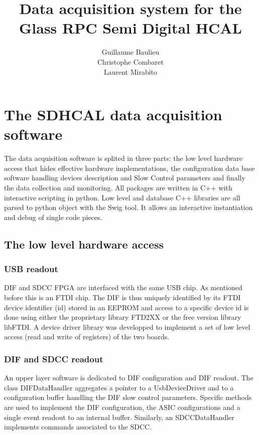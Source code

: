 \documentclass[english]{article}
\title{\textbf{Data acquisition system for the Glass RPC Semi Digital HCAL}}
\author{Guillaume Baulieu\\
		Christophe Combaret\\
		Laurent Mirabito \\
		}
\date{}
\begin{document}
\maketitle
\section{The SDHCAL data acquisition software}
The data acquisition software is splited in three parts: the low
level hardware access that hides  effective hardware implementations,
the configuration data base software handling devices description
and Slow Control parameters and finally the data collection and monitoring. All
packages are written in C++ with interactive scripting in python.
Low level and database C++ libraries are all parsed to python object
with the Swig tool. It allows an interactive instantiation and debug
of single code pieces.


\subsection{The low level hardware access}


\subsubsection{USB readout}

DIF and SDCC FPGA are interfaced with the same USB chip. As mentioned before this is  an
FTDI chip. The DIF is thus uniquely identified by its FTDI device identifier (id) stored in an EEPROM and access to
a specific device id is done using either the proprietary library
FTD2XX or the free version library libFTDI. A device driver library was developped to implement a set of low level access (read and write of registers) of the two boards. 




\subsubsection{DIF and SDCC readout}

An upper layer software is dedicated to DIF configuration and
DIF readout. The class DIFDataHandler aggregates a pointer to
a UsbDeviceDriver and to a configuration buffer handling the DIF slow control parameters. Specific methods are used to implement the DIF configuration,
the ASIC configurations and a single event readout to an internal
buffer. Similarly, an SDCCDataHandler implements commands associated to the SDCC.
\end{document}
